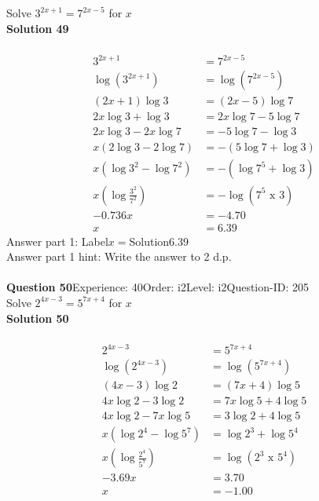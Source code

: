 \documentclass{article}
\begin{document}
Solve $3^{2x+1}=7^{2x-5}$ for $x$\\[4pt]
\noindent\textbf{Solution 49}\\[2pt]
\\[-35pt]\begin{align*}
3^{2x+1}&=7^{2x-5}\\[2pt]
\log(3^{2x+1})&=\log(7^{2x-5})\\[2pt]
(2x+1)\log3&=(2x-5)\log7\\[2pt]
2x\log3+\log3&=2x\log7-5\log7\\[2pt]
2x\log3-2x\log7&=-5\log7-\log3\\[2pt]
x(2\log3-2\log7)&=-(5\log7+\log3)\\[2pt]
x(\log3^2-\log7^2)&=-(\log7^5+\log3)\\[2pt]
x\left(\log\displaystyle\frac{3^2}{7^2}\right)&=-\log(7^5 \,\, \text{x} \,\, 3)\\[2pt]
-0.736x&=-4.70\\[2pt]
x&=6.39
\end{align*}
Answer part 1: \hspace{10pt}Label\hspace{10pt}$x=$\hspace{10pt}Solution\hspace{10pt}6.39\\
Answer part 1 hint: \hspace{15pt}Write the answer to 2 d.p.\\
\\[4pt]
\noindent\textbf{Question 50}\hspace{20pt}Experience: 40\hspace{20pt}Order: i2\hspace{20pt}Level: i2\hspace{20pt}Question-ID: 205\\[2pt]
Solve $2^{4x-3}=5^{7x+4}$ for $x$\\[4pt]
\noindent\textbf{Solution 50}\\[2pt]
\\[-35pt]\begin{align*}
2^{4x-3}&=5^{7x+4}\\[2pt]
\log(2^{4x-3})&=\log(5^{7x+4})\\[2pt]
(4x-3)\log2&=(7x+4)\log5\\[2pt]
4x\log2-3\log2&=7x\log5+4\log5\\[2pt]
4x\log2-7x\log5&=3\log2+4\log5\\[2pt]
x(\log2^4-\log5^7)&=\log2^3+\log5^4\\[2pt]
x\left(\log\displaystyle\frac{2^4}{5^7}\right)&=\log(2^3\,\,\text{x}\,\,5^4)\\[2pt]
-3.69x&=3.70\\[2pt]
x&=-1.00
\end{align*}
\end{document}
